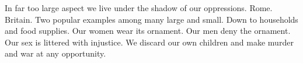 

In far too large aspect we live under the shadow of our oppressions.
Rome.  Britain.  Two popular examples among many large and small.
Down to households and food supplies.  Our women wear its ornament.
Our men deny the ornament.  Our sex is littered with injustice.  We
discard our own children and make murder and war at any opportunity.

\bye
